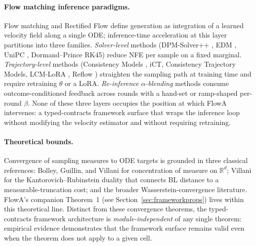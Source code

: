 \documentclass[journal,twocolumn,final]{IEEEtran}
\newcommand{\R}{\mathbb{R}}
\begin{document}
\paragraph{Flow matching inference paradigms.}
Flow matching \cite{lipman2023flow} and Rectified Flow \cite{liu2022rectified}
define generation as integration of a learned velocity field along a single
ODE; inference-time acceleration at this layer partitions into three families.
\emph{Solver-level} methods (DPM-Solver++ \cite{lu2022dpm}, EDM
\cite{karras2022edm}, UniPC \cite{zhao2023unipc}, Dormand--Prince RK45)
reduce NFE per sample on a fixed marginal. \emph{Trajectory-level} methods
(Consistency Models \cite{song2023consistency}, iCT, Consistency Trajectory
Models, LCM-LoRA \cite{luo2023lcm}, Reflow \cite{liu2022rectified}) straighten
the sampling path at training time and require retraining $\theta$ or a LoRA.
\emph{Re-inference $\alpha$-blending} methods \cite{sabour2024,yu2024abcache,zwick2025lediflow}
consume outcome-conditioned feedback across rounds with a hand-set or
ramp-shaped per-round $\beta$. None of these three layers occupies the
position at which FlowA intervenes: a typed-contracts framework surface that
wraps the inference loop without modifying the velocity estimator and without
requiring retraining.

\paragraph{Theoretical bounds.}
Convergence of sampling measures to ODE targets is grounded in three classical
references: Bolley, Guillin, and Villani \cite{bolley2012} for concentration of
measure on $\R^d$; Villani \cite{villani2003} for the Kantorovich--Rubinstein
duality that connects BL distance to a measurable-truncation cost; and the
broader Wasserstein-convergence literature. FlowA's companion Theorem~1 (see
Section~\ref{sec:frameworkprops}) lives within this theoretical line. Distinct
from these convergence theorems, the typed-contracts framework architecture
is \emph{module-independent} of any single theorem: empirical evidence
demonstrates that the framework surface remains valid even when the theorem
does not apply to a given cell.
\end{document}
